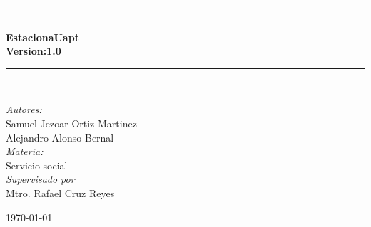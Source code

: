 \begin{titlepage}
\begin{center}
		\rule{\linewidth}{0.5mm} \\[0.1cm]
		{ \huge \bfseries  EstacionaUapt\\
			Version:1.0
			\\[0.1cm] }
		\rule{\linewidth}{0.5mm} \\[1.5cm]
		
		\noindent
		
		{\Large  \emph{Autores:}}\\[0.3cm]
		{\large  
Samuel Jezoar Ortiz Martinez \\[0.2cm]
Alejandro Alonso Bernal} \\[1cm]  
		
		{\Large  \emph{Materia:}}\\[0.3cm]
		{\large Servicio social} \\[1cm]
		
		{\Large  \emph{Supervisado por  }}\\[0.3cm]
		{\large  Mtro. Rafael Cruz Reyes}
		
		\vspace{3cm}
{\today}
	\end{center}
\end{titlepage}